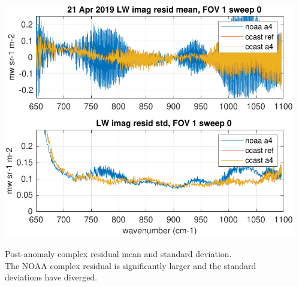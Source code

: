 \documentclass[10pt]{beamer}
\begin{document}
\begin{frame}
\begin{columns}[t]
\begin{column}{0.5\textwidth}
\end{column}
\begin{column}{0.5\textwidth}  
  \begin{centering}
  \includegraphics[width=\textwidth]{figures/LW_MW_fail_imag_fov1_sd0.pdf}
  \end{centering}\vspace{3mm}
  Post-anomaly complex residual mean and standard deviation.  \\ The
  NOAA complex residual is significantly larger and the standard
  deviations have diverged.

\end{column}
\end{columns}
\end{frame}
\end{document}
